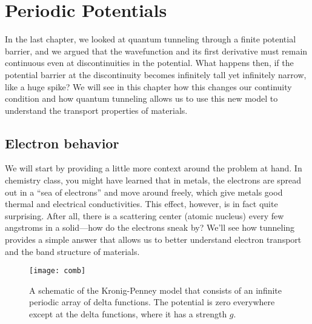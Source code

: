 %

%

\chapter{Periodic Potentials} \label{ch:period}
In the last chapter, we looked at quantum tunneling through a finite potential barrier, and we argued that the wavefunction and its first derivative must remain continuous even at discontinuities in the potential. What happens then, if the potential barrier at the discontinuity becomes infinitely tall yet infinitely narrow, like a huge spike? We will see in this chapter how this changes our continuity condition and how quantum tunneling allows us to use this new model to understand the transport properties of materials.


\section{Electron behavior}
We will start by providing a little more context around the problem at hand. In chemistry class, you might have learned that in metals, the electrons are spread out in a ``sea of electrons'' and move around freely, which give metals good thermal and electrical conductivities. This effect, however, is in fact quite surprising. After all, there is a scattering center (atomic nucleus) every few angstroms in a solid---how do the electrons sneak by? We'll see how tunneling provides a simple answer that allows us to better understand electron transport and the band structure of materials. \par 

\begin{figure}[!h]
	\centering
	\texttt{[image: comb]}
	\caption{A schematic of the Kronig-Penney model that consists of an infinite periodic array of delta functions. The potential is zero everywhere except at the delta functions, where it has a strength $g$.}
	\label{fig:comb}
\end{figure}

